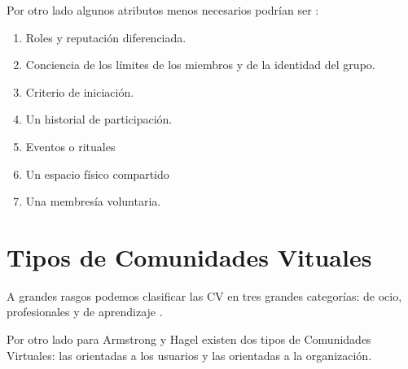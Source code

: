 Por otro lado algunos atributos menos necesarios podrían ser \cite{whittaker:1997}:
\begin{enumerate}
\item Roles y reputación diferenciada.
\item Conciencia de los límites de los miembros y de la identidad del grupo.
\item Criterio de iniciación.
\item Un historial de participación.
\item Eventos o rituales
\item Un espacio físico compartido
\item Una membresía voluntaria. 
\end{enumerate}


\section{Tipos de Comunidades Vituales}

A grandes rasgos podemos clasificar las CV en tres grandes categorías: de ocio, profesionales y de aprendizaje \cite{cabero}. 

Por otro lado para Armstrong y Hagel \cite{armstrong:1997} existen dos tipos de Comunidades Virtuales: las orientadas a los usuarios y las orientadas a la organización. 

